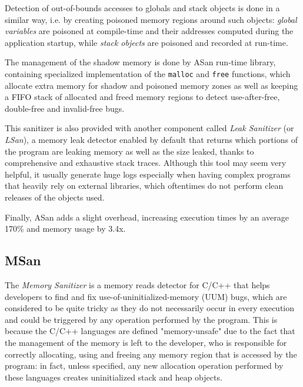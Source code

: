 Detection of out-of-bounds accesses to globals and stack objects is done in a similar way, i.e. by creating poisoned memory regions around such objects: \textit{global variables} are poisoned at compile-time and their addresses computed during the application startup, while \textit{stack objects} are poisoned and recorded at run-time.

The management of the shadow memory is done by ASan run-time library, containing specialized implementation of the \verb|malloc| and \verb|free| functions, which allocate extra memory for shadow and poisoned memory zones as well as keeping a FIFO stack of allocated and freed memory regions to detect use-after-free, double-free and invalid-free bugs.

This sanitizer is also provided with another component called \textit{Leak Sanitizer} (or \textit{LSan}), a memory leak detector enabled by default that returns which portions of the program are leaking memory as well as the size leaked, thanks to comprehensive and exhaustive stack traces. Although this tool may seem very helpful, it usually generate huge logs especially when having complex programs that heavily rely on external libraries, which oftentimes do not perform clean releases of the objects used.


Finally, ASan adds a slight overhead, increasing execution times by an average 170\% and memory usage by 3.4x.





\newpage
\subsection{MSan}
The \textit{Memory Sanitizer} \cite{stepanov2015memorysanitizer} is a memory reads detector for C/C++ that helps developers to find and fix use-of-uninitialized-memory (UUM) bugs, which are considered to be quite tricky as they do not necessarily occur in every execution and could be triggered by any operation performed by the program. This is because the C/C++ languages are defined "memory-unsafe" due to the fact that the management of the memory is left to the developer, who is responsible for correctly allocating, using and freeing any memory region that is accessed by the program: in fact, unless specified, any new allocation operation performed by these languages creates uninitialized stack and heap objects.

